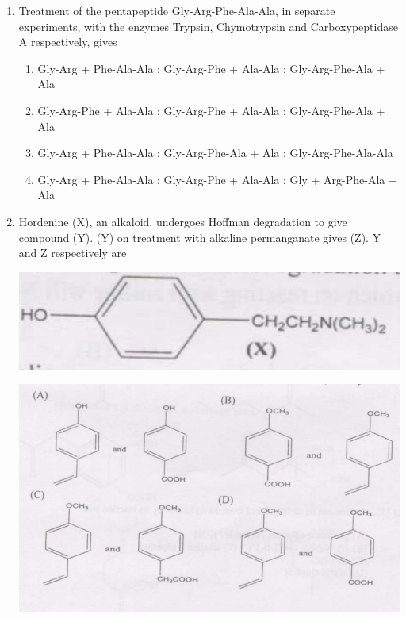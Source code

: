 \documentclass[journal,12pt,onecolumn]{IEEEtran}
\theoremstyle{remark}
\begin{document}
\begin{enumerate}
\item  Treatment of the pentapeptide Gly-Arg-Phe-Ala-Ala, in separate experiments, with the enzymes Trypsin, Chymotrypsin and Carboxypeptidase A respectively, gives \hfill{}

\begin{multicols}{2}
\begin{enumerate}[label=(\Alph*)]
\item Gly-Arg + Phe-Ala-Ala ; Gly-Arg-Phe + Ala-Ala ; Gly-Arg-Phe-Ala + Ala
\item Gly-Arg-Phe + Ala-Ala ; Gly-Arg-Phe + Ala-Ala ; Gly-Arg-Phe-Ala + Ala
\item Gly-Arg + Phe-Ala-Ala ; Gly-Arg-Phe-Ala + Ala ; Gly-Arg-Phe-Ala-Ala
\item Gly-Arg + Phe-Ala-Ala ; Gly-Arg-Phe + Ala-Ala ; Gly + Arg-Phe-Ala + Ala
\end{enumerate}
\end{multicols}


\item  Hordenine (X), an alkaloid, undergoes Hoffman degradation to give compound (Y). (Y) on treatment with alkaline permanganate gives (Z). Y and Z respectively are \hfill{}

\includegraphics[scale=1]{figs/image11.png}

\includegraphics[scale=1]{figs/image12.png}


\end{enumerate}
\end{document}

